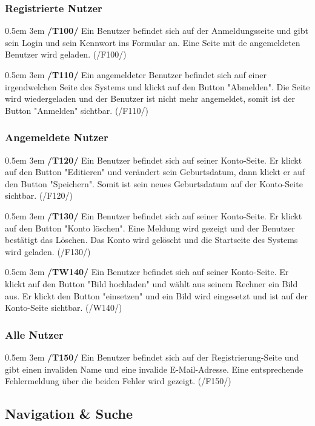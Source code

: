 \documentclass{article}
\newcommand{\specification}[3]{
	{\parindent 0.5em \hangindent 3em \hypertarget{spec:#1:#2}{\textbf{/#1#2/}} #3 \par \nobreak \vspace*{0.5em}}
}
\begin{document}
		\subsubsection{Registrierte Nutzer}
			\specification{T}{100}{Ein Benutzer befindet sich auf der Anmeldungsseite und gibt sein Login und sein Kennwort ins Formular an. Eine Seite mit de angemeldeten Benutzer wird geladen. (/F100/)}
			\specification{T}{110}{Ein angemeldeter Benutzer befindet sich auf einer irgendwelchen Seite des Systems und klickt auf den Button "Abmelden". Die Seite wird wiedergeladen und der Benutzer ist nicht mehr angemeldet, somit ist der Button "Anmelden" sichtbar. (/F110/)}
		\subsubsection{Angemeldete Nutzer}
			\specification{T}{120}{Ein Benutzer befindet sich auf seiner Konto-Seite. Er klickt auf den Button "Editieren" und verändert sein Geburtsdatum, dann klickt er auf den Button "Speichern". Somit ist sein neues Geburtsdatum auf der Konto-Seite sichtbar. (/F120/)}
			\specification{T}{130}{Ein Benutzer befindet sich auf seiner Konto-Seite. Er klickt auf den Button "Konto löschen". Eine Meldung wird gezeigt und der Benutzer bestätigt das Löschen. Das Konto wird gelöscht und die Startseite des Systems wird geladen. (/F130/)}
			\specification{TW}{140}{Ein Benutzer befindet sich auf seiner Konto-Seite. Er klickt auf den Button "Bild hochladen" und wählt aus seinem Rechner ein Bild aus. Er klickt den Button "einsetzen" und ein Bild wird eingesetzt und ist auf der Konto-Seite sichtbar. (/W140/)}
		\subsubsection{Alle Nutzer}
			\specification{T}{150}{Ein Benutzer befindet sich auf der Registrierung-Seite und gibt einen invaliden Name und eine invalide E-Mail-Adresse. Eine entsprechende Fehlermeldung über die beiden Fehler wird gezeigt. (/F150/)}
\subsection{Navigation \& Suche}
\end{document}
